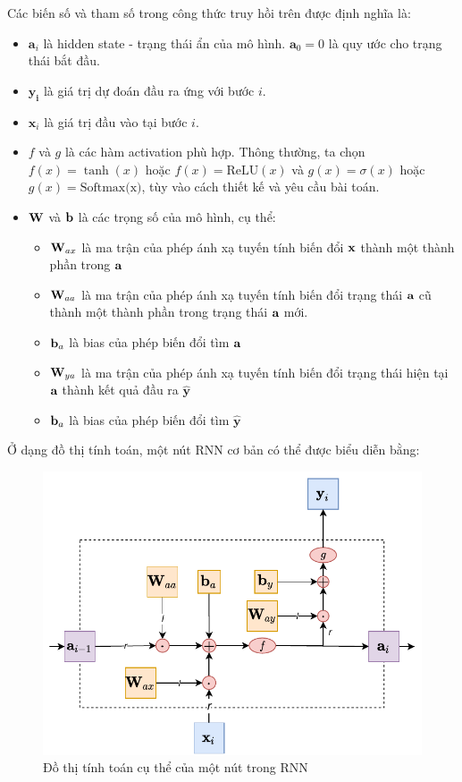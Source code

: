Các biến số và tham số trong công thức truy hồi trên được định nghĩa là:
\begin{itemize}
    \item $\symbf a_i$ là hidden state - trạng thái ẩn của mô hình. $\symbf a_0 = 0$ là quy ước cho trạng thái bắt đầu.
    \item $\symbf{\hat{y_i}}$ là giá trị dự đoán đầu ra ứng với bước $i$.
    \item $\symbf x_i$ là giá trị đầu vào tại bước $i$.
    \item $f$ và $g$ là các hàm activation phù hợp. Thông thường, ta chọn $f(x) = \tanh(x)$ hoặc $f(x) = \textrm{ReLU}(x)$ và $g(x) = \sigma (x)$ hoặc $g(x) = \textrm{Softmax(x)}$, tùy vào cách thiết kế và yêu cầu bài toán.
    \item $\textbf W$ và $\textbf b$ là các trọng số của mô hình, cụ thể:
          \begin{itemize}
              \item $\textbf W_{ax}$ là ma trận của phép ánh xạ tuyến tính biến đổi $\textbf x$ thành một thành phần trong $\textbf a$
              \item $\textbf W_{aa}$ là ma trận của phép ánh xạ tuyến tính biến đổi trạng thái $\textbf a$ cũ thành một thành phần trong trạng thái $\textbf a$ mới.
              \item $\textbf b_a$ là bias của phép biến đổi tìm $\textbf a$
              \item $\textbf W_{ya}$ là ma trận của phép ánh xạ tuyến tính biến đổi trạng thái hiện tại $\textbf a$ thành kết quả đầu ra $\hat{\textbf{y}}$
              \item $\textbf b_a$ là bias của phép biến đổi tìm $\hat{\textbf{y}}$
          \end{itemize}
\end{itemize}
Ở dạng đồ thị tính toán, một nút RNN cơ bản có thể được biểu diễn bằng:
\begin{figure}[H]
    \centering
    \includegraphics[width=\textwidth,height=\textheight,keepaspectratio]{books/artificial-neural-network/chapter06/figure-sec2345/rnn_elman.pdf}
    \caption{Đồ thị tính toán cụ thể của một nút trong RNN}
\end{figure}

